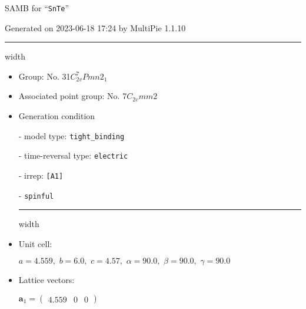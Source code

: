 \documentclass[fleqn,10pt,landscape]{article}
\begin{document}
\setcounter{MaxMatrixCols}{16}

\setlength{\baselineskip}{16pt}
\footnotesize
\begin{center}
\LARGE
SAMB for ``\texttt{SnTe}''
\end{center}
\begin{flushright}
Generated on 2023-06-18 17:24 by MultiPie 1.1.10
\end{flushright}
\vspace{1cm}


 \hfil \hrule height 1mm width \textwidth \hfil

\begin{itemize}
\item Group: No. 31\quad$C_{2v}^{7}$\quad$Pmn2_1$\quad[ orthorhombic ]

\item Associated point group: No. 7\quad$C_{2v}$\quad$mm2$\quad[ orthorhombic ]

\vspace{5mm}

\item Generation condition

\quad - model type: \texttt{tight_binding}

\quad - time-reversal type: \texttt{electric}

\quad - irrep: \texttt{[A1]}

\quad - \texttt{spinful}


 \hfil \hrule height 1mm width \textwidth \hfil

\item Unit cell:

\quad $a=4.559,\,\, b=6.0,\,\, c=4.57,\,\, \alpha=90.0,\,\, \beta=90.0,\,\, \gamma=90.0$

\item Lattice vectors:

\quad $\bm{a}_1=\begin{pmatrix} 4.559 & 0 & 0 \end{pmatrix}$


\end{itemize}
\end{document}
